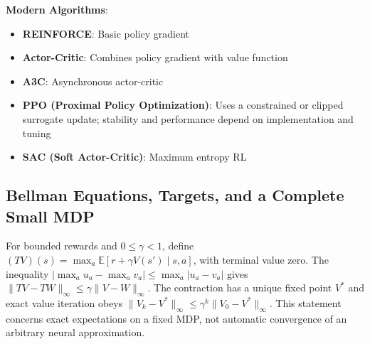 \documentclass[11pt,twoside]{article}
\numberwithin{equation}{section}
\newcommand{\E}{\mathbb{E}}
\theoremstyle{plain}
\theoremstyle{definition}
\theoremstyle{remark}
\begin{document}
\textbf{Modern Algorithms}:
\begin{itemize}
\item \textbf{REINFORCE}: Basic policy gradient
\item \textbf{Actor-Critic}: Combines policy gradient with value function
\item \textbf{A3C}: Asynchronous actor-critic
\item \textbf{PPO (Proximal Policy Optimization)}: Uses a constrained or clipped surrogate update; stability and performance depend on implementation and tuning
\item \textbf{SAC (Soft Actor-Critic)}: Maximum entropy RL
\end{itemize}

\subsection{Bellman Equations, Targets, and a Complete Small MDP}
\label{sec:rl-worked}
For bounded rewards and $0\le\gamma<1$, define
$(TV)(s)=\max_a\E[r+\gamma V(s')\mid s,a]$, with terminal value zero.
The inequality $|\max_a u_a-\max_a v_a|\le\max_a|u_a-v_a|$ gives
$\|TV-TW\|_\infty\le\gamma\|V-W\|_\infty$.
The contraction has a unique fixed point $V^*$ and exact value iteration obeys
$\|V_k-V^*\|_\infty\le\gamma^k\|V_0-V^*\|_\infty$.
This statement concerns exact expectations on a fixed MDP, not automatic
convergence of an arbitrary neural approximation.
\end{document}
